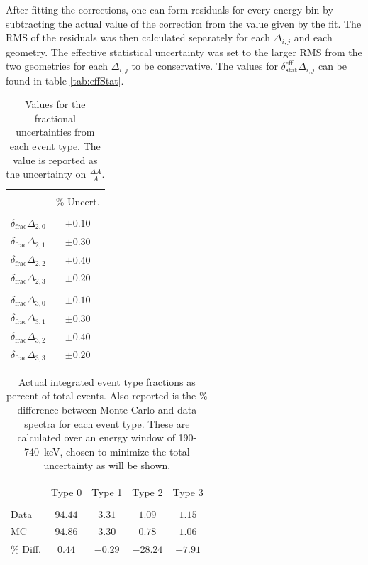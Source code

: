 After fitting the corrections, one can form residuals for every energy bin by subtracting the actual value
of the correction from the value given by the fit. The RMS of the residuals was
then calculated
separately for each $\Delta_{i,j}$ and each geometry. The effective statistical uncertainty
was set to the larger RMS from the two geometries for each $\Delta_{i,j}$ to be conservative.
The values for $\delta^{\mathrm{eff}}_{\mathrm{stat}}\Delta_{i,j}$
can be found in table \ref{tab:effStat}.

\setlength{\tabcolsep}{12pt}

\begin{table}[h]
  \caption{Values for the fractional uncertainties from each
  event type. The value is reported as the uncertainty on $\frac{\Delta A}{A}$.} 
  \centering
  \begin{tabular}{l c }
    \hline \hline \\ [-1.75ex]
    & \% Uncert. \\
    \hline \\ [-1.75ex]
    $\delta_{\mathrm{frac}}\Delta_{2,0}$ & $\pm0.10$ \\ [0.50ex]
    $\delta_{\mathrm{frac}}\Delta_{2,1}$ & $\pm0.30$ \\ [0.50ex]
    $\delta_{\mathrm{frac}}\Delta_{2,2}$ & $\pm0.40$ \\ [0.50ex]
    $\delta_{\mathrm{frac}}\Delta_{2,3}$ & $\pm0.20$  \\ [0.50ex]
    \hline \\ [-1.75ex]
    $\delta_{\mathrm{frac}}\Delta_{3,0}$ & $\pm0.10$ \\ [0.50ex]
    $\delta_{\mathrm{frac}}\Delta_{3,1}$ & $\pm0.30$ \\ [0.50ex]
    $\delta_{\mathrm{frac}}\Delta_{3,2}$ & $\pm0.40$ \\ [0.50ex]
    $\delta_{\mathrm{frac}}\Delta_{3,3}$ & $\pm0.20$  \\ [0.50ex]
    \hline
  \end{tabular}
  \label{tab:frac}
\end{table}

\begin{table}[h]
  \caption{Actual integrated event type fractions as percent of
    total events. Also reported is the \% difference between Monte Carlo and data
    spectra for each event type. These are calculated over an energy window of
    190-740~keV, chosen to minimize the total uncertainty as will be shown.} 
  \centering
  \begin{tabular}{l c c c c }
    \hline \hline \\ [-1.75ex]
     & Type 0 & Type 1 & Type 2 & Type 3 \\
    \hline \\ [-1.75ex]
    Data & $94.44$ & $3.31$ & $1.09$ & $1.15$  \\ [0.50ex]
    MC & $94.86$ & $3.30$ & $0.78$ & $1.06$  \\ [0.50ex]
    \% Diff. & $0.44$ & $-0.29$ & $-28.24$ & $-7.91$  \\ [0.50ex]    
    \hline
  \end{tabular}
  \label{tab:integratedFrac}
\end{table}

